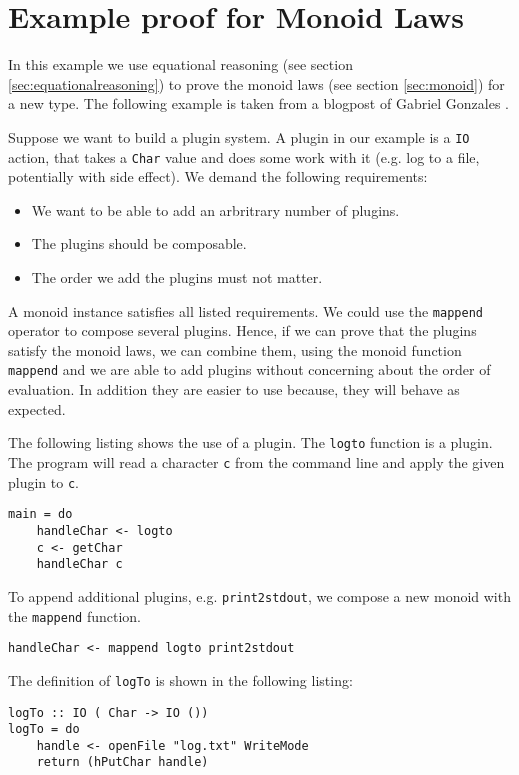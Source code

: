 \section{Example proof for Monoid Laws}
\label{sec:example}
In this example we use equational reasoning (see section \ref{sec:equationalreasoning}) to prove the monoid laws (see section \ref{sec:monoid}) for a new type.
The following example is taken from a blogpost of Gabriel Gonzales \cite{gonzales14}. 

Suppose we want to build a plugin system. A plugin in our example is a \verb|IO| action, that takes a \verb|Char| value and does some work with it (e.g. log to a file, potentially with side effect). We demand the following requirements:
\begin{itemize}
\item We want to be able to add an arbritrary number of plugins.
\item The plugins should be composable.
\item The order we add the plugins must not matter.
\end{itemize}

A monoid instance satisfies all listed requirements. We could use the \verb|mappend| operator to compose several plugins. Hence, if we can prove that the plugins satisfy the monoid laws, we can combine them, using the monoid function \verb|mappend| and we are able to add plugins without concerning about the order of evaluation. In addition they are easier to use because, they will behave as expected.

The following listing shows the use of a plugin. The \verb|logto| function is a plugin. The program will read a character \verb|c| from the command line and apply the given plugin to \verb|c|.

\begin{verbatim}
main = do
    handleChar <- logto
    c <- getChar
    handleChar c
\end{verbatim}

To append additional plugins, e.g. \verb|print2stdout|, we compose a new monoid with the \verb|mappend| function.
\begin{verbatim}
handleChar <- mappend logto print2stdout
\end{verbatim}
The definition of \verb|logTo| is shown in the following listing: 

\begin{verbatim}
logTo :: IO ( Char -> IO ())
logTo = do
    handle <- openFile "log.txt" WriteMode
    return (hPutChar handle)
\end{verbatim}

